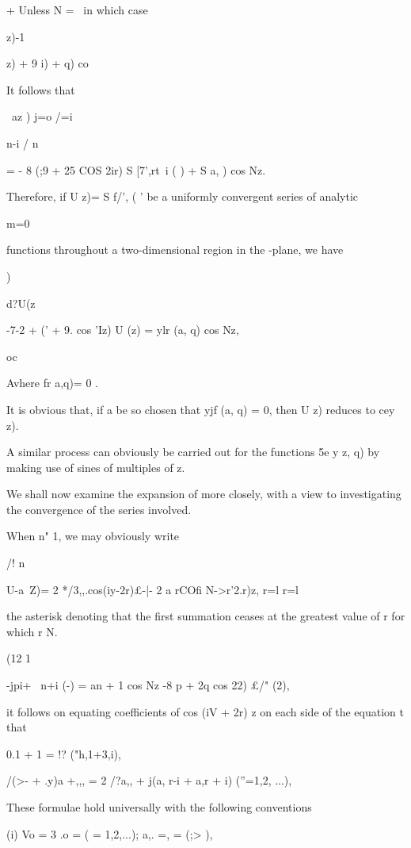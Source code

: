 + Unless N = \, in which case \ \ \ \ {z)-1\ \ {z) + 9 i) + q) co%

%
%

It follows that

\ az ) j=o /=i

n-i / n \

= - 8 (;9 + 25 COS 2ir) S [7',rt\ i ( ) + S a, ) cos Nz.

Therefore, if U z)= S f/', ( ' be a uniformly convergent series of
analytic

m=0

functions throughout a two-dimensional region in the -plane, we have

)

d?U(z

-7-2 + (' + 9. cos 'Iz) U (z) = ylr (a, q) cos Nz,

oc

Avhere fr a,q)= 0 .

It is obvious that, if a be so chosen that yjf (a, q) = 0, then U z)
reduces to cey z).

A similar process can obviously be carried out for the functions 5e y
z, q) by making use of sines of multiples of z.


We shall now examine the expansion of  more closely, with a view
to investigating the convergence of the series involved.

When n" 1, we may obviously write

/! n

U-a\ Z)= 2 */3,,.cos(iy-2r)£-|- 2 a rCOfi N->r'2.r)z, r=l r=l

the asterisk denoting that the first summation ceases at the greatest
value of r for which r N.

 (12 1

-jpi+ \ n+i (-) = an + 1 cos Nz -8 p + 2q cos 22) £/" (2),

it follows on equating coefficients of cos (iV + 2r) z on each side of
the equation t that

0.1 + 1 = !? ("h,1+3,i),

/(>- + .y)a +,,, = 2 /?a,, + j(a, r-i + a,r + i) (''=1,2, ...),

These formulae hold universally with the following conventions %

(i) Vo = 3 .o = ( = 1,2,...); a,. =, = (;> ),

}}
